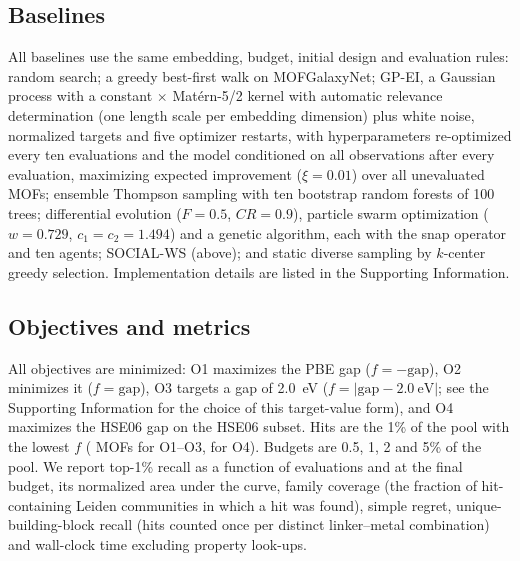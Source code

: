 \documentclass[journal=jcisd8,manuscript=article]{achemso}
\begin{document}
\subsection{Baselines}
All baselines use the same embedding, budget, initial design and evaluation rules: random search; a greedy best-first walk on MOFGalaxyNet; GP-EI, a Gaussian process\cite{rasmussen2006gp} with a constant $\times$ Mat\'ern-5/2 kernel with automatic relevance determination (one length scale per embedding dimension) plus white noise, normalized targets and five optimizer restarts, with hyperparameters re-optimized every ten evaluations and the model conditioned on all observations after every evaluation, maximizing expected improvement\cite{jones1998ego} ($\xi=0.01$) over all unevaluated MOFs; ensemble Thompson sampling\cite{thompson1933} with ten bootstrap random forests\cite{breiman2001rf} of 100 trees; differential evolution\cite{storn1997de} ($F=0.5$, $CR=0.9$), particle swarm optimization\cite{kennedy1995pso,clerc2002pso} ($w=0.729$, $c_1=c_2=1.494$) and a genetic algorithm\cite{holland1975adaptation}, each with the snap operator and ten agents; SOCIAL-WS (above); and static diverse sampling by $k$-center greedy selection.\cite{sener2018coreset} Implementation details are listed in the Supporting Information.

\subsection{Objectives and metrics}
All objectives are minimized: O1 maximizes the PBE gap ($f=-\mathrm{gap}$), O2 minimizes it ($f=\mathrm{gap}$), O3 targets a gap of 2.0~eV ($f=|\mathrm{gap}-2.0\ \mathrm{eV}|$; see the Supporting Information for the choice of this target-value form), and O4 maximizes the HSE06 gap on the HSE06 subset. Hits are the 1\% of the pool with the lowest $f$ (\nHits{} MOFs for O1--O3, \nHitsHse{} for O4). Budgets are 0.5, 1, 2 and 5\% of the pool. We report top-1\% recall as a function of evaluations and at the final budget, its normalized area under the curve, family coverage (the fraction of hit-containing Leiden communities in which a hit was found), simple regret, unique-building-block recall (hits counted once per distinct linker--metal combination) and wall-clock time excluding property look-ups.
\end{document}
